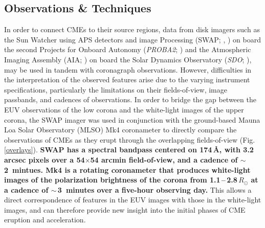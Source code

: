 \documentclass[namedreferences]{solarphysics}
\begin{document}
\begin{article}
\section{Observations \& Techniques}
\label{sect:techniques}


In order to connect CMEs to their source regions, data from disk imagers such as the Sun Watcher using APS detectors and image Processing (SWAP; , ) on board the second Projects for Onboard Autonomy (\emph{PROBA2}; ) and the Atmospheric Imaging Assembly (AIA; ) on board the Solar Dynamics Observatory (\emph{SDO}; ), may be used in tandem with coronagraph observations. However, difficulties in the interpretation of the observed features arise due to the varying instrument specifications, particularly the limitations on their fields-of-view, image passbands, and cadences of observations. In order to bridge the gap between the EUV observations of the low corona and the white-light images of the upper corona, the SWAP imager was used in conjunction with the ground-based Mauna Loa Solar Observatory (MLSO) Mk4 coronameter \cite{2003SPIE.4843...66E} to directly compare the observations of CMEs as they erupt through the overlapping fields-of-view (Fig.\,\ref{overlays}). {\bf SWAP has a spectral bandpass centered on 174\,\AA, with 3.2 arcsec pixels over a 54$\times$54 arcmin field-of-view, and a cadence of $\sim$\,2~mintues. Mk4 is a rotating coronameter that produces white-light images of the polarization brightness of the corona from 1.1\,--\,2.8\,$R_{\odot}$ at a cadence of $\sim$\,3~minutes over a five-hour observing day.} This allows a direct correspondence of features in the EUV images with those in the white-light images, and can therefore provide new insight into the initial phases of CME eruption and acceleration.


\end{article}
\end{document}
